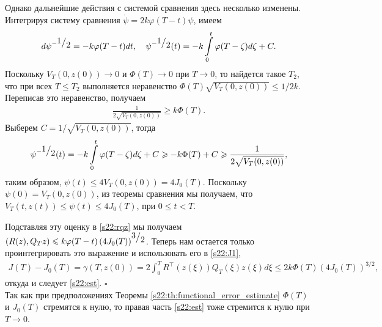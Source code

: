 \documentclass[../main.tex]{subfiles}
\begin{document}
Однако дальнейшие действия с системой сравнения здесь несколько изменены. 
Интегрируя систему сравнения $\dot{\psi} = 2k \varphi(T-t)\psi$, имеем
\begin{gather*}
 d\psi^{-\frc{1}{2}} = -k \varphi(T-t) dt, \quad
 \psi^{-\frc{1}{2}}(t) = -k \int\limits_0^t \varphi(T-\zeta) d\zeta + C.
\end{gather*}
Поскольку $V_T(0,z(0))\to 0$ и $\Phi(T) \to 0$ при $T\to 0$, то найдется такое $T_2$, что при всех $T\leqslant T_2$ выполняется неравенство $\Phi(T) \sqrt{V_T(0,z(0))} \leqslant 1/2k$. 
Переписав это неравенство, получаем
\begin{gather*}
 \frac{1}{2\sqrt{V_T(0,z(0))}} \geqslant k\Phi(T).
\end{gather*} 
Выберем $C = 1/\sqrt{V_T(0,z(0))}$, тогда
 \begin{gather*}
\psi^{-\frc{1}{2}}(t) = -k \int\limits_0^t \varphi(T-\zeta) d\zeta + C\geqslant -k\Phi(T)+C\geqslant \frac{1}{2\sqrt{V_T(0,z(0))}}, 
\end{gather*} 
таким образом, $\psi(t) \leqslant 4V_T(0,z(0))=4J_0(T)$. 
Поскольку $\psi(0)=V_T(0,z(0))$, из теоремы сравнения мы получаем, что $V_T(t,z(t))\leqslant \psi(t) \leqslant 4J_0(T)$, при $ 0\leqslant t <T$.

Подставляя эту оценку в \eqref{s22:rqz} мы получаем $\left( R(z), Q_T z\right) \leqslant k \varphi(T-t) \left( 4J_0(T) \right) ^{\frc{3}{2}} $.
Теперь нам остается только проинтегрировать это выражение и использовать его в \eqref{s22:J1},
\begin{gather*}
J(T)-J_0(T)= \gamma (T,z(0)) = 
 2\int_{0}^{T} R^{\top}(z(\xi))Q_T(\xi) z(\xi) d\xi\leqslant 2k \Phi(T) (4J_0(T))^{3/2}, 
\end{gather*}
откуда и следует \eqref{s22:est}.
 \hfill $ \square $ \\
Так как при предположениях Теоремы \ref{s22:th:functional_error_estimate} $\Phi(T)$ и $J_0(T)$ стремятся к нулю, то правая часть \eqref{s22:est} тоже стремится к нулю при $T\to 0$.
\end{document}
